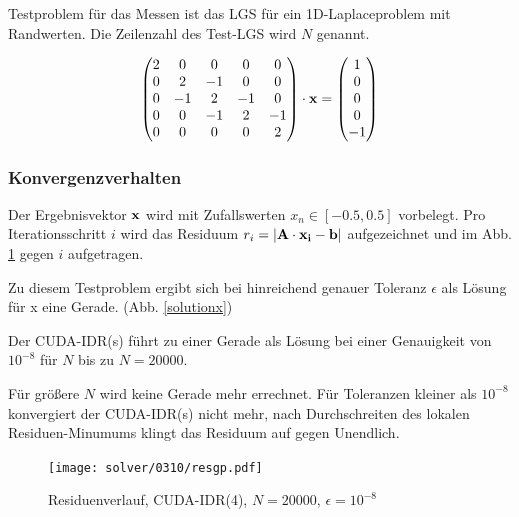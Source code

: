 \documentclass[journal]{IEEEtran}
\begin{document}
Testproblem für das Messen ist das LGS für ein \mbox{1D-Laplaceproblem} mit Randwerten.
Die Zeilenzahl des \mbox{Test-LGS} wird $N$ genannt.

\begin{displaymath}
  \begin{pmatrix}
      2 &  0  &  0  & 0   & 0 \\
      0 &  2  & -1  & 0   & 0 \\
      0 & -1  &  2  & -1  & 0 \\
      0 &  0  &  -1  &  2 & -1 \\
      0 &  0  &  0   &  0 & 2  \\
  \end{pmatrix}
   \cdot  \bf{x}
   =
  \begin{pmatrix} 1 \\ 0  \\ 0 \\ 0  \\ -1
  \end{pmatrix}
\end{displaymath}

\subsubsection{Konvergenzverhalten}

Der Ergebnisvektor $\bf x$ wird mit Zufallswerten $x_n  \in [-0.5, 0.5]$ vorbelegt.
Pro Iterationsschritt $i$ wird das Residuum $r_i = | \bf{A} \cdot \bf{x_i} - \bf b |$ aufgezeichnet und
im Abb. \ref{residuum}  gegen $i$ aufgetragen.

Zu diesem Testproblem ergibt sich bei hinreichend genauer Toleranz $\epsilon$ als Lösung
für x eine Gerade. (Abb. \ref{solutionx})

Der CUDA-IDR(s) führt zu einer Gerade als Lösung bei einer Genauigkeit von $10^{-8}$
für $N$ bis zu $N=20000$.

Für größere $N$ wird keine Gerade mehr errechnet.
Für Toleranzen kleiner als $10^{-8}$ konvergiert der CUDA-IDR(s)
nicht mehr, nach Durchschreiten des lokalen Residuen-Minumums
klingt das Residuum auf gegen Unendlich.

\begin{figure}[htbp]

   \texttt{[image: solver/0310/resgp.pdf]}

   \caption{ \label{residuum} Residuenverlauf, CUDA-IDR(4), $N=20000$, \mbox{$ \epsilon = 10^{-8}$}  }%

\end{figure}
\end{document}
